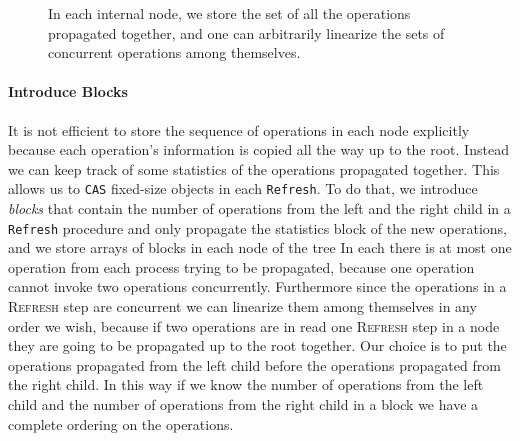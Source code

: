 \documentclass[10pt]{article}
\renewcommand{\tt}[1]{\texttt{#1}}
\renewcommand{\it}[1]{\textit{#1}}
\newcommand{\nf}[1]{{\normalfont{\texttt{#1}}}}
\theoremstyle{definition}
\begin{document}
\begin{figure}[h]
\begin{center}
\caption{\label{fig::set} In each internal node, we store the set of all the operations propagated together, and one can arbitrarily linearize the sets of concurrent operations among themselves.}
\end{center}
\end{figure}

\paragraph{Introduce Blocks} It is not efficient to store the sequence of operations in each node explicitly because each operation's information is copied all the way up to the root.
Instead we can keep track of some statistics of the operations propagated together. This allows us to \texttt{CAS} fixed-size objects in each \tt{Refresh}. To do that, we introduce \it{blocks} that contain the number of operations from the left and the right child in a \texttt{Refresh} procedure and only propagate the statistics block of the new operations, and we store arrays of blocks in each node of the tree In each \nf{Refresh} there is at most one operation from each process trying to be propagated, because one operation cannot invoke two operations concurrently. Furthermore since the operations in a \textsc{Refresh} step are concurrent we can linearize them  among themselves in any order we wish, because if two operations are in read one \textsc{Refresh} step in a node they are going to be propagated up to the root together. Our choice is to put the operations propagated from the left child before the operations propagated from the right child. In this way if we know the number of operations from the left child and the number of operations from the right child in a block  we have a complete ordering on the operations.
\end{document}
